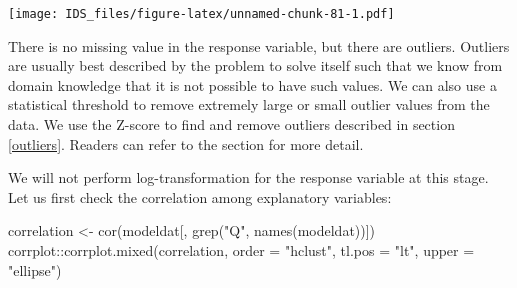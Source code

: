 \documentclass[
  12pt,
]{krantz}
\makeatletter
\newenvironment{Shaded}{\begin{snugshade}}{\end{snugshade}}
\newcommand{\AttributeTok}[1]{\textcolor[rgb]{0.61,0.61,0.61}{#1}}
\newcommand{\CommentTok}[1]{\textcolor[rgb]{0.37,0.37,0.37}{\textit{#1}}}
\newcommand{\DecValTok}[1]{\textcolor[rgb]{0.06,0.06,0.06}{#1}}
\newcommand{\FloatTok}[1]{\textcolor[rgb]{0.06,0.06,0.06}{#1}}
\newcommand{\FunctionTok}[1]{\textcolor[rgb]{0,0,0}{#1}}
\newcommand{\NormalTok}[1]{#1}
\newcommand{\OtherTok}[1]{\textcolor[rgb]{0.37,0.37,0.37}{#1}}
\newcommand{\SpecialCharTok}[1]{\textcolor[rgb]{0,0,0}{#1}}
\newcommand{\StringTok}[1]{\textcolor[rgb]{0.5,0.5,0.5}{#1}}
\newenvironment{kframe}{%
\medskip{}
\setlength{\fboxsep}{.8em}
 \def\at@end@of@kframe{}%
 \ifinner\ifhmode%
  \def\at@end@of@kframe{\end{minipage}}%
  \begin{minipage}{\columnwidth}%
 \fi\fi%
 \def\FrameCommand##1{\hskip\@totalleftmargin \hskip-\fboxsep
 \colorbox{shadecolor}{##1}\hskip-\fboxsep
     \hskip-\linewidth \hskip-\@totalleftmargin \hskip\columnwidth}%
 \MakeFramed {\advance\hsize-\width
   \@totalleftmargin\z@ \linewidth\hsize
   \@setminipage}}%
 {\par\unskip\endMakeFramed%
 \at@end@of@kframe}
\renewenvironment{Shaded}{\begin{kframe}}{\end{kframe}}
\makeatother
\begin{document}
\begin{Shaded}
\end{Shaded}

\texttt{[image: IDS\_files/figure-latex/unnamed-chunk-81-1.pdf]}

There is no missing value in the response variable, but there are outliers. Outliers are usually best described by the problem to solve itself such that we know from domain knowledge that it is not possible to have such values. We can also use a statistical threshold to remove extremely large or small outlier values from the data. We use the Z-score to find and remove outliers described in section \ref{outliers}. Readers can refer to the section for more detail.

\begin{Shaded}
\end{Shaded}

We will not perform log-transformation for the response variable at this stage. Let us first check the correlation among explanatory variables:

\begin{Shaded}
\begin{Highlighting}[]
\NormalTok{correlation }\OtherTok{\textless{}{-}} \FunctionTok{cor}\NormalTok{(modeldat[, }\FunctionTok{grep}\NormalTok{(}\StringTok{"Q"}\NormalTok{, }\FunctionTok{names}\NormalTok{(modeldat))])}
\NormalTok{corrplot}\SpecialCharTok{::}\FunctionTok{corrplot.mixed}\NormalTok{(correlation, }\AttributeTok{order =} \StringTok{"hclust"}\NormalTok{, }\AttributeTok{tl.pos =} \StringTok{"lt"}\NormalTok{, }
    \AttributeTok{upper =} \StringTok{"ellipse"}\NormalTok{)}
\end{Highlighting}
\end{Shaded}
\end{document}
